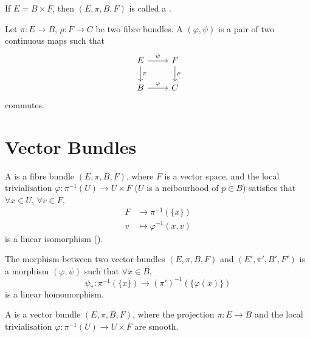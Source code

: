 \documentclass[openany, oneside, a5paper]{book}
\begin{document}
If $E = B \times F$, then $(E, \pi, B, F)$ is called a .

\begin{definition}[Morphism]
    Let $\pi \colon E \to B$, $\rho \colon F \to C$ be two fibre bundles.
    A  $(\varphi, \psi)$ is a pair of two continuous maps such that
    \begin{equation}
        \begin{tikzcd}
            E \arrow[d, "\pi"] \arrow[r, "\psi"] & F \arrow[d, "\rho"] \\
            B \arrow[r, "\varphi"]               & C                  
        \end{tikzcd}
    \end{equation}
    commutes.
\end{definition}

\section{Vector Bundles}
\begin{definition}
    A  is a fibre bundle $(E, \pi, B, F)$, where $F$ is a vector space, and the local trivialisation $\varphi \colon \pi^{-1}(U) \to U \times F$ ($U$ is a neibourhood of $p \in B$) satisfies that $\forall x \in U$, $\forall v \in F$, 
    \begin{equation}
        \begin{aligned}
            F &\to \pi^{-1}(\{x\}) \\ 
            v &\mapsto \varphi^{-1}(x, v)
        \end{aligned}
    \end{equation}
    is a linear isomorphism ().
\end{definition}

\begin{definition}
    The morphism between two vector bundles $(E, \pi, B, F)$ and $(E', \pi', B', F')$ is a morphism $(\varphi, \psi)$ such that $\forall x \in B$, 
    \begin{equation}
        \psi_* \colon \pi^{-1}(\{x\}) \to (\pi')^{-1}(\{\varphi(x)\})
    \end{equation}
    is a linear homomorphism.
\end{definition}

\begin{definition}
    A  is a vector bundle $(E, \pi, B, F)$, where the projection $\pi \colon E \to B$ and the local trivialisation $\varphi \colon \pi^{-1}(U) \to U \times F$ are smooth.
\end{definition}
\end{document}
